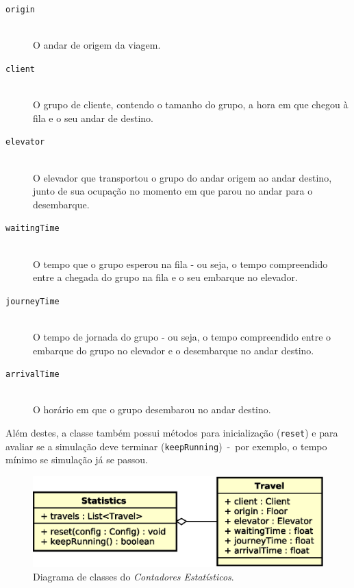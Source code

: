 \begin{description}
  \item[\texttt{origin}] \hfill \\
    O andar de origem da viagem.

  \item[\texttt{client}] \hfill \\
    O grupo de cliente, contendo o tamanho do grupo, a hora em que
    chegou à fila e o seu andar de destino.

  \item[\texttt{elevator}] \hfill \\
    O elevador que transportou o grupo do andar origem ao andar destino, junto
    de sua ocupação no momento em que parou no andar para o desembarque.

  \item[\texttt{waitingTime}] \hfill \\
    O tempo que o grupo esperou na fila - ou seja, o tempo compreendido entre a
    chegada do grupo na fila e o seu embarque no elevador.

  \item[\texttt{journeyTime}] \hfill \\
    O tempo de jornada do grupo - ou seja, o tempo compreendido entre o embarque
    do grupo no elevador e o desembarque no andar destino.

  \item[\texttt{arrivalTime}] \hfill \\
    O horário em que o grupo desembarou no andar destino.
\end{description}

Além destes, a classe também possui métodos para inicialização (\texttt{reset})
e para avaliar se a simulação deve terminar (\texttt{keepRunning})~-~por
exemplo, o tempo mínimo se simulação já se passou.

\begin{figure}[htb!]
  \centering
  \includegraphics[scale=0.6]{img/Stats.eps}
  \caption{Diagrama de classes do \textit{Contadores Estatísticos}.}
\label{fig:diagram:stats}
\end{figure}

